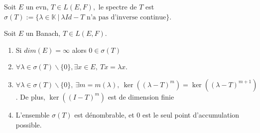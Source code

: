 \begin{definition}
    Soit $E$ un evn, $T\in L(E,F),$ le spectre de $T$ est $\sigma(T):=\{\lambda\in \mathbb{K}\ |\ \lambda Id-T \text{ n'a pas d'inverse continue}\} $.
\end{definition}
\begin{propriete}
    Soit $E$ un Banach, $T\in L(E,F).$
    \begin{enumerate}[label=(\roman*)]
        \item Si $dim(E)=\infty $ alors $0\in \sigma(T)$
        \item $\forall \lambda\in \sigma(T)\backslash \{0\}, \exists x\in E,\ Tx=\lambda x. $
        \item $\forall \lambda \in  \sigma(T)\backslash \{0\} ,\ \exists m=m(\lambda),\ \ker(\left( \lambda -T \right) ^m)=\ker\left( (\lambda-T)^{m+1} \right)  $. De plus, $\ker\left( (I-T)^m \right) $ est de dimension finie
        \item L'ensemble $\sigma(T)$ est dénombrable, et $0$ est le seul point d'accumulation possible.
    \end{enumerate}

\end{propriete}

